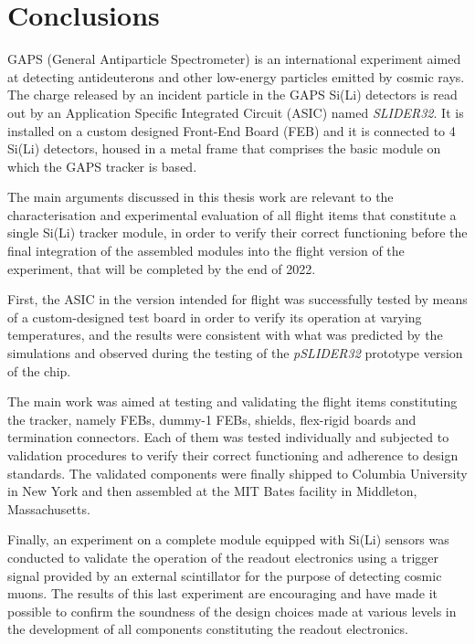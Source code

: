 \chapter*{Conclusions}

\par
GAPS (General Antiparticle Spectrometer) is an international experiment aimed at detecting antideuterons and other low-energy particles emitted by cosmic rays. The charge released by an incident particle in the GAPS Si(Li) detectors is read out by an Application Specific Integrated Circuit (ASIC) named \textit{SLIDER32}. It is installed on a custom designed Front-End Board (FEB) and it is connected to 4 Si(Li) detectors, housed in a metal frame that comprises the basic module on which the GAPS tracker is based.

\par
The main arguments discussed in this thesis work are relevant to the characterisation and experimental evaluation of all flight items that constitute a single Si(Li) tracker module, in order to verify their correct functioning before the final integration of the assembled modules into the flight version of the experiment, that will be completed by the end of 2022.

\par
First, the ASIC in the version intended for flight was successfully tested by means of a custom-designed test board in order to verify its operation at varying temperatures, and the results were consistent with what was predicted by the simulations and observed during the testing of the \textit{pSLIDER32} prototype version of the chip.

\par
The main work was aimed at testing and validating the flight items constituting the tracker, namely FEBs, dummy-1 FEBs, shields, flex-rigid boards and termination connectors. Each of them was tested individually and subjected to validation procedures to verify their correct functioning and adherence to design standards. The validated components were finally shipped to Columbia University in New York and then assembled at the MIT Bates facility in Middleton, Massachusetts.

\par
Finally, an experiment on a complete module equipped with Si(Li) sensors was conducted to validate the operation of the readout electronics using a trigger signal provided by an external scintillator for the purpose of detecting cosmic muons. The results of this last experiment are encouraging and have made it possible to confirm the soundness of the design choices made at various levels in the development of all components constituting the readout electronics.

